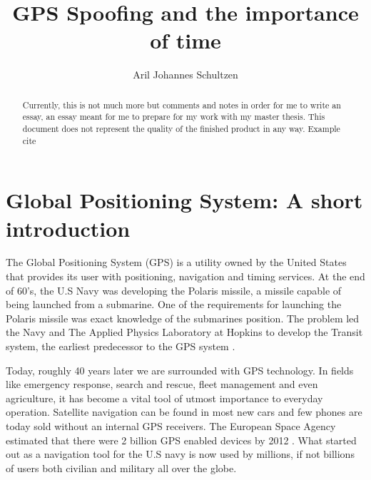 \documentclass[12pt,english,a4paper]{article}
\title{GPS Spoofing and the importance of time}
\author{Aril Johannes Schultzen}
\begin{document}
\maketitle
\thispagestyle{empty}
\setcounter{page}{0}
\newpage
\tableofcontents
\thispagestyle{empty}
\setcounter{page}{0}
\newpage
\thispagestyle{empty}
\setcounter{page}{0}

\begin{abstract}
Currently, this is not much more but comments and notes in order for me to write an essay, an essay meant for me to prepare for my work with my master thesis. This document does not represent the quality of the finished product in any way. Example cite \cite{KandR}
\end{abstract}

\newpage
\clearpage
\setcounter{page}{1}

\section{Global Positioning System: A short introduction}
The Global Positioning System (GPS) is a utility owned by the United States that provides its user with positioning, navigation and timing services. At the end of 60's, the U.S Navy was developing the Polaris missile, a missile capable of being launched from a submarine. One of the requirements for launching the Polaris missile was exact knowledge of the submarines position. The problem led the Navy and The Applied Physics Laboratory at Hopkins to develop the Transit system, the earliest predecessor to the GPS system \cite{SteJ}. 

Today, roughly 40 years later we are surrounded with GPS technology. In fields like emergency response, search and rescue, fleet management and even agriculture, it has become a vital tool of utmost importance to everyday operation. Satellite navigation can be found in most new cars and few phones are today sold without an internal GPS receivers. The European Space Agency estimated that there were 2 billion GPS enabled devices by 2012 \cite{ESA}. What started out as a navigation tool for the U.S navy is now used by millions, if not billions of users both civilian and military all over the globe.
\end{document}
